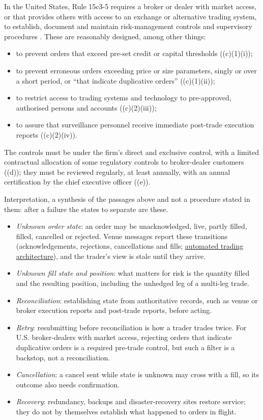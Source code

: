\begin{qfmethod}
In the United States, Rule 15c3-5 requires a broker or dealer with market access, or that provides others with access to an exchange or alternative trading system, to establish, document and maintain risk-management controls and supervisory procedures \citep[17 CFR 240.15c3-5(b)]{cfr-240-15c3-5}. These are reasonably designed, among other things:
\begin{itemize}
\item to prevent orders that exceed pre-set credit or capital thresholds ((c)(1)(i));
\item to prevent erroneous orders exceeding price or size parameters, singly or over a short period, or ``that indicate duplicative orders'' ((c)(1)(ii));
\item to restrict access to trading systems and technology to pre-approved, authorised persons and accounts ((c)(2)(iii));
\item to assure that surveillance personnel receive immediate post-trade execution reports ((c)(2)(iv)).
\end{itemize}
The controls must be under the firm's direct and exclusive control, with a limited contractual allocation of some regulatory controls to broker-dealer customers ((d)); they must be reviewed regularly, at least annually, with an annual certification by the chief executive officer ((e)).

 Interpretation, a synthesis of the passages above and not a procedure stated in them: after a failure the states to separate are these.
\begin{itemize}
\item \emph{Unknown order state}: an order may be unacknowledged, live, partly filled, filled, cancelled or rejected. Venue messages report these transitions (acknowledgements, rejections, cancellations and fills; \hyperref[def:automated-trading-architecture]{automated trading architecture}), and the trader's view is stale until they arrive.
\item \emph{Unknown fill state and position}: what matters for risk is the quantity filled and the resulting position, including the unhedged leg of a multi-leg trade.
\item \emph{Reconciliation}: establishing state from authoritative records, such as venue or broker execution reports and post-trade reports, before acting.
\item \emph{Retry}: resubmitting before reconciliation is how a trader trades twice. For U.S. broker-dealers with market access, rejecting orders that indicate duplicative orders is a required pre-trade control, but such a filter is a backstop, not a reconciliation.
\item \emph{Cancellation}: a cancel sent while state is unknown may cross with a fill, so its outcome also needs confirmation.
\item \emph{Recovery}: redundancy, backups and disaster-recovery sites restore service; they do not by themselves establish what happened to orders in flight.
\end{itemize}


\end{qfmethod}
